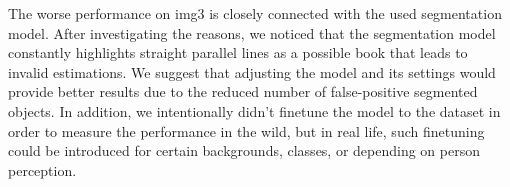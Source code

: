 The worse performance on img3 is closely connected with the used segmentation model. After investigating the reasons, we noticed that the segmentation model constantly highlights straight parallel lines as a possible book that leads to invalid estimations. We suggest that adjusting the model and its settings would provide better results due to the reduced number of false-positive segmented objects. In addition, we intentionally didn't finetune the model to the dataset in order to measure the performance in the wild, but in real life, such finetuning could be introduced for certain backgrounds, classes, or depending on person perception.